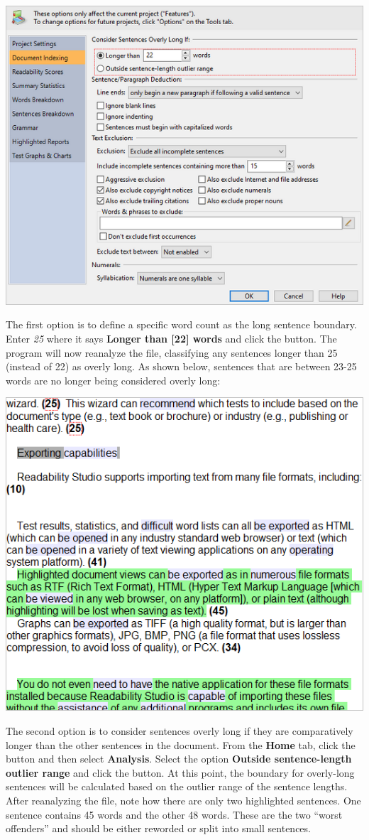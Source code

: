 \documentclass[
]{book}
\theoremstyle{definition}
\theoremstyle{definition}
\theoremstyle{definition}
\theoremstyle{definition}
\theoremstyle{remark}
\begin{document}
\includegraphics{Images/featuressentoptions.png}

The first option is to define a specific word count as the long sentence boundary. Enter \emph{25} where it says \textbf{Longer than {[}22{]} words} and click the  button. The program will now reanalyze the file, classifying any sentences longer than 25 (instead of 22) as overly long. As shown below, sentences that are between 23-25 words are no longer being considered overly long:

\begin{center}\includegraphics[width=0.75\linewidth,]{Images/featuressentences25} \end{center}

The second option is to consider sentences overly long if they are comparatively longer than the other sentences in the document. From the \textbf{Home} tab, click the  button and then select \textbf{Analysis}. Select the option \textbf{Outside sentence-length outlier range} and click the  button. At this point, the boundary for overly-long sentences will be calculated based on the outlier range of the sentence lengths. After reanalyzing the file, note how there are only two highlighted sentences. One sentence contains 45 words and the other 48 words. These are the two ``worst offenders'' and should be either reworded or split into small sentences.
\end{document}
